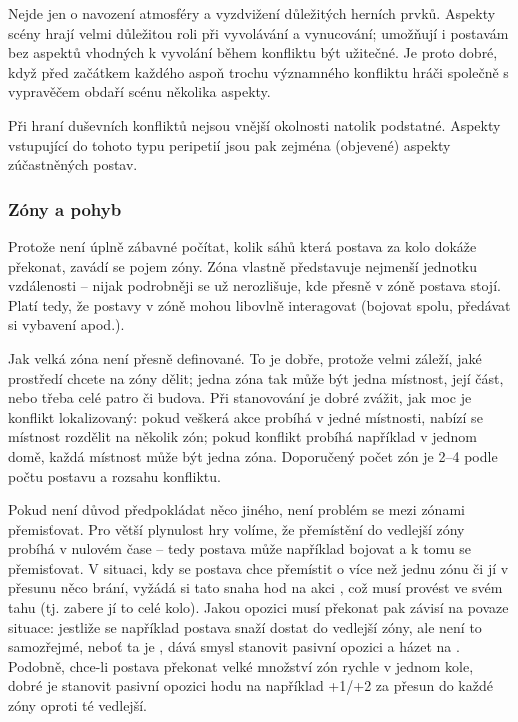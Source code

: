 \documentclass[../main.tex]{subfiles}
\begin{document}
Nejde jen o navození atmosféry a vyzdvižení důležitých herních prvků. Aspekty scény hrají
velmi důležitou roli při vyvolávání a vynucování; umožňují i postavám bez aspektů
vhodných k vyvolání během konfliktu být užitečné. Je proto dobré, když před začátkem
každého aspoň trochu významného konfliktu hráči společně s vypravěčem obdaří scénu několika aspekty.

Při hraní duševních konfliktů nejsou vnější okolnosti natolik podstatné. Aspekty
vstupující do tohoto typu peripetií jsou pak zejména (objevené) aspekty zúčastněných postav.

\subsubsection{Zóny a pohyb}
\label{sec:zónyapohyb}

Protože není úplně zábavné počítat, kolik sáhů  která
postava za kolo dokáže překonat, zavádí se pojem zóny. Zóna vlastně představuje nejmenší
jednotku vzdálenosti – nijak podrobněji se už nerozlišuje, kde přesně v zóně postava
stojí. Platí tedy, že postavy v zóně mohou libovlně interagovat (bojovat spolu, předávat
si vybavení apod.).

Jak velká zóna není přesně definované. To je dobře, protože velmi záleží, jaké prostředí
chcete na zóny dělit; jedna zóna tak může být jedna místnost, její část, nebo třeba celé
patro či budova. Při stanovování je dobré zvážit, jak moc je konflikt lokalizovaný: pokud
veškerá akce probíhá v jedné místnosti, nabízí se místnost rozdělit na několik zón; pokud
konflikt probíhá například v jednom domě, každá místnost může být jedna zóna. Doporučený
počet zón je 2–4 podle počtu postavu a rozsahu konfliktu.

Pokud není důvod předpokládat něco jiného, není problém se mezi zónami přemisťovat. Pro
větší plynulost hry volíme, že přemístění do vedlejší zóny probíhá v nulovém čase – tedy
postava může například bojovat a k tomu se přemisťovat. V situaci, kdy se postava chce
přemístit o více než jednu zónu či jí v přesunu něco brání, vyžádá si tato snaha hod na
akci , což musí provést ve svém tahu (tj. zabere jí to celé kolo). Jakou
opozici musí překonat pak závisí na povaze situace: jestliže se například postava snaží
dostat do vedlejší zóny, ale není to samozřejmé, neboť ta je ,
dává smysl stanovit pasivní opozici a házet na . Podobně, chce-li postava
překonat velké množství zón rychle v jednom kole, dobré je stanovit pasivní opozici hodu
na například +1/+2 za přesun do každé zóny oproti té vedlejší.
\end{document}
